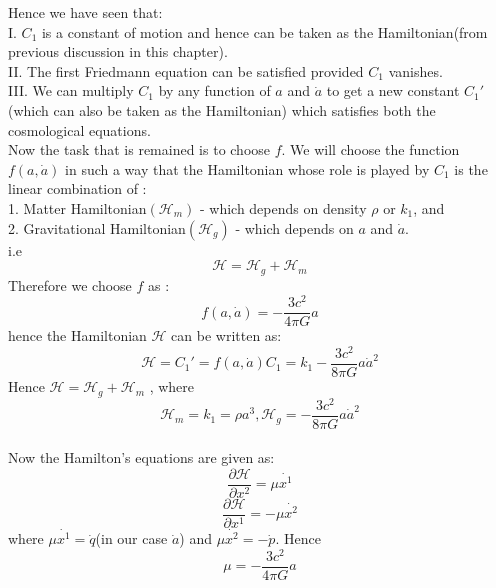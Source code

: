 \documentclass[14pt]{extarticle}
\begin{document}
Hence we have seen that:\\
I. $C_{1}$  is a constant of motion and hence can be taken as the Hamiltonian(from previous discussion in this chapter). \\
II. The first Friedmann equation can be satisfied provided $C_{1}$ vanishes.\\
III. We can multiply $C_{1}$ by any function of $a$ and $\dot{a}$ to get a new constant $C_{1}'$(which can also be taken as the Hamiltonian) which satisfies both the cosmological equations. \\
Now the task that is remained is to choose $f$. We will choose the function $f(a,\dot{a})$ in such a way that the Hamiltonian whose role is played by $C_{1}$ is the linear combination of :\\
1. Matter Hamiltonian$(\mathcal{H}_{m})$ - which depends on density $\rho$ or $k_{1}$, and \\
2. Gravitational Hamiltonian$(\mathcal{H}_{g})$ - which depends on $a$ and $\dot{a}$.\\
i.e \\
\begin{equation}
\mathcal{H}=\mathcal{H}_{g}+\mathcal{H}_{m}
\end{equation}
Therefore we choose $f$ as :\\
\begin{equation}
f(a,\dot{a})=-\frac{3 c^{2}}{4 \pi G} a
\end{equation}
hence the Hamiltonian $\mathcal{H}$ can be written as:
\begin{equation}
\mathcal{H} = C_{1}' =f(a, \dot{a}) C_{1}= k_{1} - \frac{3 c^{2}}{8 \pi G} a \dot{a}^{2}
\end{equation}
Hence $\mathcal{H}=\mathcal{H}_{g}+\mathcal{H}_{m}$ , where
\begin{equation}
\mathcal{H}_{m} = k_{1}=\rho a^{3}  ,   \mathcal{H}_{g} = -\frac{3 c^{2}}{8 \pi G} a \dot{a}^{2}
\end{equation}\\
Now the Hamilton's equations are given as:
\begin{equation}
\frac{\partial \mathcal{H}}{\partial x^{2}} = \mu \dot{x^{1}}
\end{equation}
\begin{equation}
\frac{\partial \mathcal{H}}{\partial x^{1}}=-\mu \dot{x^{2}}
\end{equation}
where $\mu \dot{x^{1}}= \dot{q}$(in our case $\dot{a}$) and $\mu \dot{x^{2}}= -\dot{p}$. Hence \\
\begin{equation}
\mu = -\frac{3 c^{2}}{4 \pi G} a
\end{equation} 
\end{document}
